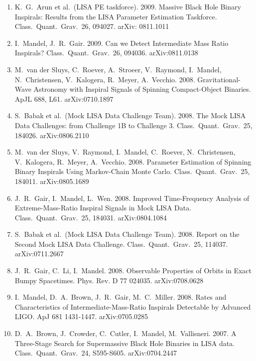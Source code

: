 \documentclass[margin,line]{res}
\begin{document}
\begin{resume}
\begin{enumerate}
\item  K.~G.~Arun et al.~(LISA PE taskforce). 2009.  Massive Black Hole Binary Inspirals: Results from the LISA Parameter Estimation Taskforce.  Class.~Quant.~Grav.~26, 094027.  arXiv: 0811.1011

\item  I.~Mandel, J.~R.~Gair.  2009.  Can we Detect Intermediate Mass Ratio Inspirals?  Class.~Quant.~Grav.~26, 094036.  arXiv:0811.0138

\item  M.~van der Sluys, C.~Roever, A.~Stroeer, V.~Raymond, I.~Mandel, N.~Christensen, 
V.~Kalogera, R.~Meyer, A.~Vecchio. 2008.  Gravitational-Wave Astronomy with Inspiral Signals of Spinning Compact-Object Binaries.  ApJL 688, L61. arXiv:0710.1897

\item  S.~Babak et al.~(Mock LISA Data Challenge Team). 2008. The Mock LISA Data Challenges: from Challenge 1B to Challenge 3.  Class.~Quant.~Grav.~25, 184026.
arXiv:0806.2110 

\item  M.~van der Sluys, V.~Raymond, I.~Mandel, C.~Roever, N.~Christensen, 
V.~Kalogera, R.~Meyer, A.~Vecchio.  2008. Parameter Estimation of 
Spinning Binary Inspirals Using Markov-Chain Monte Carlo.  Class.~Quant.~Grav.~25, 184011.
arXiv:0805.1689

\item  J.~R.~Gair, I.~Mandel, L.~Wen. 2008. Improved Time-Frequency Analysis of 
Extreme-Mass-Ratio Inspiral Signals in Mock LISA Data. Class.~Quant.~Grav.~25, 184031.
arXiv:0804.1084

\item  S.~Babak et al.~(Mock LISA Data Challenge Team). 2008. Report on the 
Second Mock LISA Data Challenge.  Class.~Quant.~Grav.~25, 114037.
arXiv:0711.2667

\item  J.~R.~Gair, C.~Li, I.~Mandel. 2008. Observable Properties of Orbits in 
Exact Bumpy Spacetimes.  Phys. Rev. D 77 024035.  arXiv:0708.0628

\item  I.~Mandel, D.~A.~Brown, J.~R.~Gair, M.~C.~Miller. 2008. Rates and 
Characteristics of Intermediate-Mass-Ratio Inspirals Detectable by 
Advanced LIGO.  ApJ 681 1431-1447. arXiv:0705.0285

\item  D.~A.~Brown, J.~Crowder, C.~Cutler, I.~Mandel, M.~Vallisneri. 2007.  A 
Three-Stage Search for Supermassive Black Hole Binaries in LISA data. 
Class.~Quant.~Grav.~24, S595-S605. arXiv:0704.2447


\end{enumerate}
\end{resume}
\end{document}
